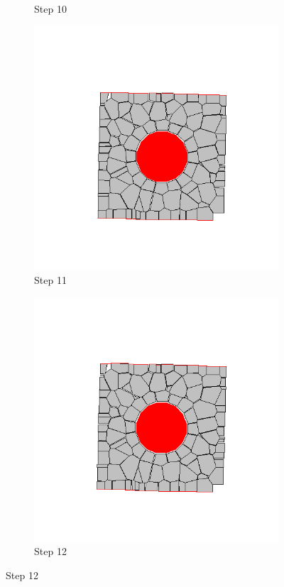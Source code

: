 \begin{figure}[ht!]
\begin{subfigure}{.25\textwidth}
      \caption{Step 10}
      \end{subfigure}%
      \begin{subfigure}{.25\textwidth}
        \centering
        \includegraphics[width=1.0\linewidth]{Files/Small_ASR/CR/DEP5-STEP(011).png}
      \caption{Step 11}
      \end{subfigure}%
      \begin{subfigure}{.25\textwidth}
        \centering
        \includegraphics[width=1.0\linewidth]{Files/Small_ASR/CR/DEP5-STEP(012).png}
      \caption{Step 12}
      \end{subfigure}


\end{figure}
